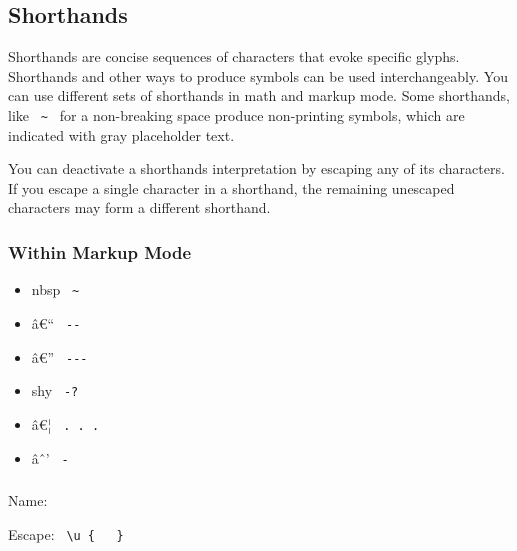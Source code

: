 \subsection{Shorthands}\label{shorthands}

Shorthands are concise sequences of characters that evoke specific
glyphs. Shorthands and other ways to produce symbols can be used
interchangeably. You can use different sets of shorthands in math and
markup mode. Some shorthands, like \texttt{\ \textasciitilde{}\ } for a
non-breaking space produce non-printing symbols, which are indicated
with gray placeholder text.

You can deactivate a shorthand\textquotesingle s interpretation by
escaping any of its characters. If you escape a single character in a
shorthand, the remaining unescaped characters may form a different
shorthand.

\subsubsection{Within Markup Mode}\label{within-markup-mode}

\begin{itemize}
\tightlist
\item
  \label{symbol-space.nobreak}{{ nbsp }
  \texttt{\ \textasciitilde{}\ }}
\item
  \label{symbol-dash.en}{{ â€`` } \texttt{\ -\/-\ }}
\item
  \label{symbol-dash.em}{{ â€'' } \texttt{\ -\/-\/-\ }}
\item
  \label{symbol-hyph.soft}{{ shy } \texttt{\ -?\ }}
\item
  \label{symbol-dots.h}{{ â€¦ } \texttt{\ .\ .\ .\ }}
\item
  \label{symbol-minus}{{ âˆ' } \texttt{\ -\ }}
\end{itemize}

{ }

\subsubsection{\texorpdfstring{{ }}{ }}\label{section}

Name: \texttt{\ }


Escape: \texttt{\ \textbackslash{}u\ \{\ }{\texttt{\ }}\texttt{\ \}\ }


